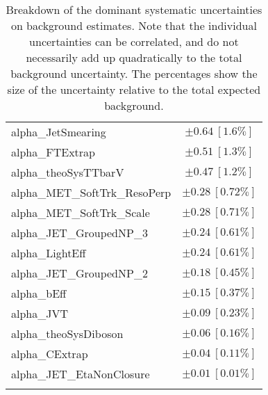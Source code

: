 \begin{table}
\begin{center}
\begin{tabular*}{\textwidth}{@{\extracolsep{\fill}}lc}
alpha\_JetSmearing         & $\pm 0.64\ [1.6\%] $       \\
alpha\_FTExtrap         & $\pm 0.51\ [1.3\%] $       \\
alpha\_theoSysTTbarV         & $\pm 0.47\ [1.2\%] $       \\
alpha\_MET\_SoftTrk\_ResoPerp         & $\pm 0.28\ [0.72\%] $       \\
alpha\_MET\_SoftTrk\_Scale         & $\pm 0.28\ [0.71\%] $       \\
alpha\_JET\_GroupedNP\_3         & $\pm 0.24\ [0.61\%] $       \\
alpha\_LightEff         & $\pm 0.24\ [0.61\%] $       \\
alpha\_JET\_GroupedNP\_2         & $\pm 0.18\ [0.45\%] $       \\
alpha\_bEff         & $\pm 0.15\ [0.37\%] $       \\
alpha\_JVT         & $\pm 0.09\ [0.23\%] $       \\
alpha\_theoSysDiboson         & $\pm 0.06\ [0.16\%] $       \\
alpha\_CExtrap         & $\pm 0.04\ [0.11\%] $       \\
alpha\_JET\_EtaNonClosure         & $\pm 0.01\ [0.01\%] $       \\
\noalign{\smallskip}\hline\noalign{\smallskip}
\end{tabular*}
\end{center}
\caption[Breakdown of uncertainty on background estimates]{
Breakdown of the dominant systematic uncertainties on background estimates.
Note that the individual uncertainties can be correlated, and do not necessarily add up quadratically to 
the total background uncertainty. The percentages show the size of the uncertainty relative to the total expected background.
\label{table.results.bkgestimate.uncertainties.SRB_TT}}
\end{table}
%